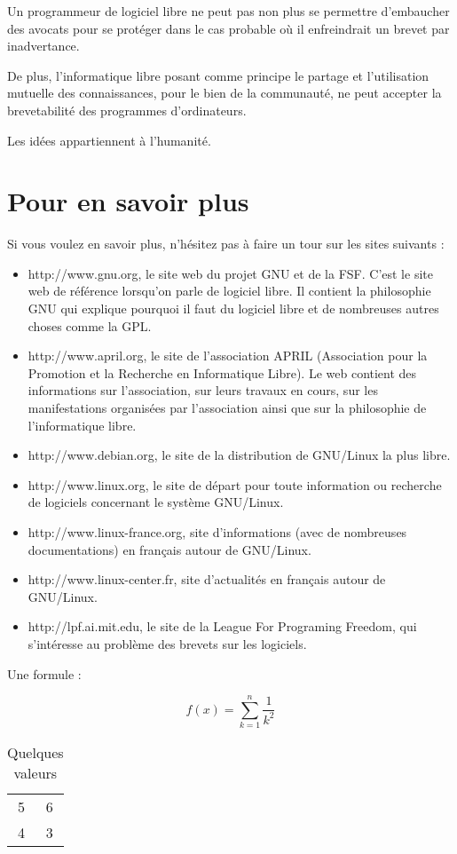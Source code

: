 \documentclass{article}
\begin{document}
Un programmeur de logiciel libre ne peut pas non plus se permettre d'embaucher des avocats pour se protéger dans le cas probable où il enfreindrait un brevet par inadvertance.

De plus, l'informatique libre posant comme principe le partage et l'utilisation mutuelle des connaissances, pour le bien de la communauté, ne peut accepter la brevetabilité des programmes d'ordinateurs.

Les idées appartiennent à l'humanité.
\section{Pour en savoir plus}

Si vous voulez en savoir plus, n'hésitez pas à faire un tour sur les sites suivants :
\begin{itemize}
     \item http://www.gnu.org, le site web du projet GNU et de la FSF. C'est le site web de référence lorsqu'on parle de logiciel libre. Il contient la philosophie GNU qui explique pourquoi il faut du logiciel libre et de nombreuses autres choses comme la GPL.
    \item     http://www.april.org, le site de l'association APRIL (Association pour la Promotion et la Recherche en Informatique Libre). Le web contient des informations sur l'association, sur leurs travaux en cours, sur les manifestations organisées par l'association ainsi que sur la philosophie de l'informatique libre.
    \item    http://www.debian.org, le site de la distribution de GNU/Linux la plus libre.
    \item     http://www.linux.org, le site de départ pour toute information ou recherche de logiciels concernant le système GNU/Linux.
    \item     http://www.linux-france.org, site d'informations (avec de nombreuses documentations) en français autour de GNU/Linux.
    \item    http://www.linux-center.fr, site d'actualités en français autour de GNU/Linux.
    \item     http://lpf.ai.mit.edu, le site de la League For Programing Freedom, qui s'intéresse au problème des brevets sur les logiciels.
\end{itemize}


Une formule :

\begin{equation}
   f(x) = \sum_{k=1}^n \frac{1}{k^2} \label{intelligent}
\end{equation}

\begin{table}[h!]
    \centering
    \begin{tabular}{c|c}
       5  & 6 \\
      4   & 3
    \end{tabular}
    \caption{Quelques valeurs}
    \label{tab:my_label}
\end{table}
\end{document}
